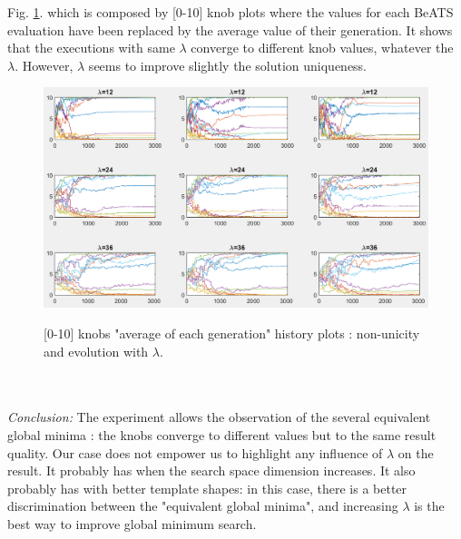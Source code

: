 \newpage
Fig. \ref{fig:lambdaknobsgenmean}. which is composed by [0-10] knob plots where the values for each BeATS evaluation have been replaced by the average value of their generation. It shows that the executions with same $\lambda$ converge to different knob values, whatever the $\lambda$. However, $\lambda$ seems to improve slightly the solution uniqueness.
\begin{figure}[!h]
	\caption{[0-10] knobs "average of each generation" history plots : non-unicity and evolution with $\lambda$.}
	\includegraphics[width=7in]{figures/results_figures/lambda/knobs_lambda_all_genmean.png}
	\label{fig:lambdaknobsgenmean}
\end{figure}\\
\\
\emph{Conclusion:} The experiment allows the observation of the several equivalent global minima : the knobs converge to different values but to the same result quality. Our case does not empower us to highlight any influence of $\lambda$ on the result. It probably has when the search space dimension increases. It also probably has with better template shapes: in this case, there is a better discrimination between the "equivalent global minima", and increasing $\lambda$ is the best way to improve global minimum search.
\newpage